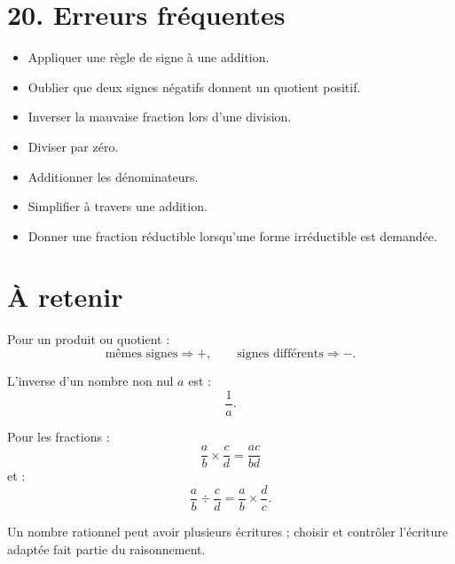 \section{20. Erreurs fréquentes}

\begin{itemize}
\item Appliquer une règle de signe à une addition.
\item Oublier que deux signes négatifs donnent un quotient positif.
\item Inverser la mauvaise fraction lors d'une division.
\item Diviser par zéro.
\item Additionner les dénominateurs.
\item Simplifier à travers une addition.
\item Donner une fraction réductible lorsqu'une forme irréductible est demandée.
\end{itemize}

\section{À retenir}

\begin{aretenir}
Pour un produit ou quotient :
\[
\boxed{\text{mêmes signes}\Rightarrow +,\qquad \text{signes différents}\Rightarrow -}.
\]

L'inverse d'un nombre non nul $a$ est :
\[
\boxed{\dfrac1a}.
\]

Pour les fractions :
\[
\boxed{\dfrac ab\times\dfrac cd=\dfrac{ac}{bd}}
\]
et :
\[
\boxed{\dfrac ab\div\dfrac cd=\dfrac ab\times\dfrac dc}.
\]

Un nombre rationnel peut avoir plusieurs écritures ; choisir et contrôler l'écriture adaptée fait partie du raisonnement.
\end{aretenir}
